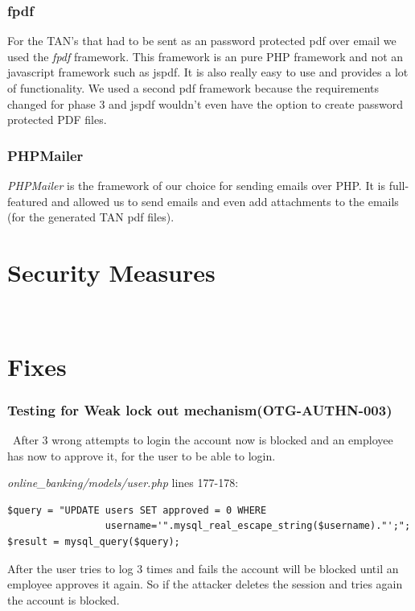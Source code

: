 \documentclass[headsepline,footsepline,footinclude=false,oneside,fontsize=11pt,paper=a4,listof=totoc,bibliography=totoc]{scrbook} %
\begin{document}
\subsection{fpdf}

For the TAN's that had to be sent as an password protected pdf over email we used the \textit{fpdf} framework. This framework is an pure PHP framework and not an javascript framework such as jspdf. It is also really easy to use and provides a lot of functionality. We used a second pdf framework because the requirements changed for phase 3 and jspdf wouldn't even have the option to create password protected PDF files.

\subsection{PHPMailer}

\textit{PHPMailer} is the framework of our choice for sending emails over PHP. It is full-featured and allowed us to send emails and even add attachments to the emails (for the generated TAN pdf files).

\chapter{Security Measures} \

\chapter{Fixes}

\subsection{Testing for Weak lock out mechanism(OTG-AUTHN-003)}\
After 3 wrong attempts to login the account now is blocked and an employee has now to approve it, for the user to be able to login. \

\textit{online\_banking/models/user.php} lines 177-178:\\

\begin{lstlisting} 
$query = "UPDATE users SET approved = 0 WHERE 
                 username='".mysql_real_escape_string($username)."';"; 
$result = mysql_query($query);
\end{lstlisting} 
After the user tries to log 3 times and fails the account will be blocked until an employee approves it again. So if the attacker deletes the session and tries again the account is blocked.\\
\end{document}
